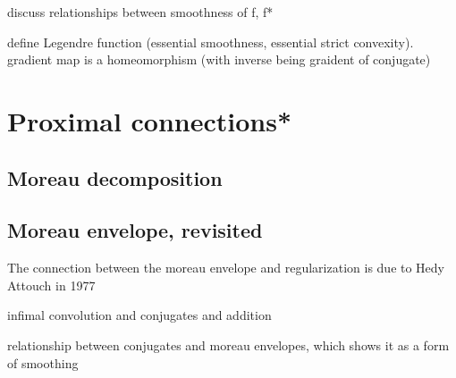 discuss relationships between smoothness of f, f* 

define Legendre function (essential smoothness, essential strict convexity).
gradient map is a homeomorphism (with inverse being graident of conjugate) 

\section{Proximal connections*}

\subsection{Moreau decomposition}
\label{sec:moreau_decomposition}

\subsection{Moreau envelope, revisited}

The connection between the moreau envelope and regularization is due to Hedy
Attouch in 1977  

infimal convolution and conjugates and addition

relationship between conjugates and moreau envelopes, which shows it as a form
of smoothing 

